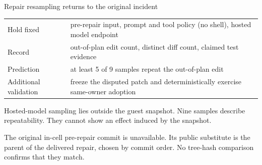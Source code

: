\begin{frame}[t]{\ev{\tagP}Repair resampling returns to the original incident}
{\small
\begin{tabularx}{\textwidth}{@{}L{3.6cm}Y@{}}
\toprule
Hold fixed & pre-repair input, prompt and tool policy (no shell), hosted model endpoint\\
Record & out-of-plan edit count, distinct diff count, claimed test evidence\\
Prediction & at least 5 of 9 samples repeat the out-of-plan edit\\
Additional validation & freeze the disputed patch and deterministically exercise same-owner adoption\\
\bottomrule
\end{tabularx}\par}
\vspace{.25cm}
{\small Hosted-model sampling lies outside the guest snapshot. Nine samples describe repeatability. They cannot show an effect induced by the snapshot.\par}
\vspace{.1cm}
{\small The original in-cell pre-repair commit is unavailable. Its public substitute is the parent of the delivered repair, chosen by commit order. No tree-hash comparison confirms that they match.\par}
\end{frame}
